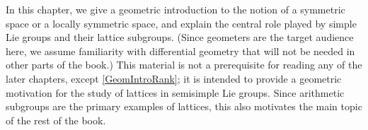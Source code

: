 
\label{WhatisLocSymmChap}


In this chapter, we give a geometric introduction to the notion of a
symmetric space or a locally symmetric space, and explain the
central role played by simple Lie groups and their lattice subgroups.
(Since geometers are the target audience here, we assume familiarity with differential geometry that will not be needed in other parts of the book.)
This material is not a prerequisite for reading any of the later
chapters, except \cref{GeomIntroRank}; it is intended to provide
a geometric motivation for the study of lattices in semisimple Lie
groups. Since arithmetic subgroups are the primary examples of lattices, this also motivates the main topic of the rest of the book.




